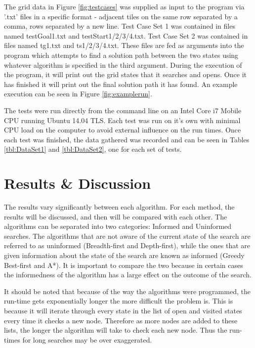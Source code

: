 \documentclass[12pt]{article}
\begin{document}
The grid data in Figure \ref{fig:testcases} was supplied as input to the program via '.txt' files in a specific format - adjacent tiles on the same row separated by a comma, rows separated by a new line. Test Case Set 1 was contained in files named testGoal1.txt and testStart1/2/3/4.txt. Test Case Set 2 was contained in files named tg1.txt and ts1/2/3/4.txt. These files are fed as arguments into the program which attempts to find a solution path between the two states using whatever algorithm is specified in the third argument. During the execution of the program, it will print out the grid states that it searches and opens. Once it has finished it will print out the final solution path it has found. An example execution can be seen in Figure \ref{fig:examplerun}.

The tests were run directly from the command line on an Intel Core i7 Mobile CPU running Ubuntu 14.04 TLS. Each test was run on it's own with minimal CPU load on the computer to avoid external influence on the run times. Once each test was finished, the data gathered was recorded and can be seen in Tables \ref{tbl:DataSet1} and \ref{tbl:DataSet2}, one for each set of tests.


\section{Results \& Discussion}

The results vary significantly between each algorithm. For each method, the results will be discussed, and then will be compared with each other. The algorithms can be separated into two categories: Informed and Uninformed searches. The algorithms that are not aware of the current state of the search are referred to as uninformed (Breadth-first and Depth-first), while the ones that are given information about the state of the search are known as informed (Greedy Best-first and A*). It is important to compare the two because in certain cases the informedness of the algorithm has a large effect on the outcome of the search.

It should be noted that because of the way the algorithms were programmed, the run-time gets exponentially longer the more difficult the problem is. This is because it will iterate through every state in the list of open and visited states every time it checks a new node. Therefore as more nodes are added to these lists, the longer the algorithm will take to check each new node. Thus the run-times for long searches may be over exaggerated.
\end{document}
